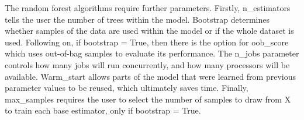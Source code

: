 \documentclass[../thesis.tex]{subfiles}
\begin{document}
The random forest algorithms require further parameters. Firstly, n\_estimators tells the user the number of trees within the model. Bootstrap determines whether samples of the data are used within the model or if the whole dataset is used. Following on, if bootstrap = True, then there is the option for oob\_score which uses out-of-bag samples to evaluate its performance. The n\_jobs parameter controls how many jobs will run concurrently, and how many processors will be available. Warm\_start allows parts of the model that were learned from previous parameter values to be reused, which ultimately saves time. Finally, max\_samples requires the user to select the number of samples to draw from X to train each base estimator, only if bootstrap = True.

\newpage
\begin{landscape}
\begin{table}[hbt!]
    \centering{}
\end{table}
\end{landscape}
\end{document}
